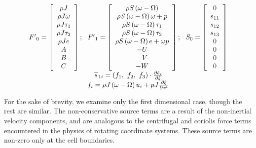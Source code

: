 \begin{equation}
\begin{array}{c}
{{F'}_0} = \left[ {\begin{array}{*{20}{c}}
{\rho J}\\
{\rho J\omega }\\
{\rho J{\tau _1}}\\
{\rho J{\tau _2}}\\
{\rho Je}\\
A\\
B\\
C
\end{array}} \right];\,\,\,\,{{F'}_1} = \left[ {\begin{array}{*{20}{c}}
{\rho S\left( {\omega  - \Omega } \right)}\\
{\rho S\left( {\omega  - \Omega } \right)\omega  + p}\\
{\rho S\left( {\omega  - \Omega } \right){\tau _1}}\\
{\rho S\left( {\omega  - \Omega } \right){\tau _2}}\\
{\rho S\left( {\omega  - \Omega } \right)e + \omega p}\\
{ - U}\\
{ - V}\\
{ - W}
\end{array}} \right];\,\,\,\,{S_0} = \left[ {\begin{array}{*{20}{c}}
0\\
{{s_{11}}}\\
{{s_{12}}}\\
{{s_{13}}}\\
0\\
0\\
0\\
0
\end{array}} \right]\\
{{\mathord{\buildrel{\lower3pt\hbox{$\scriptscriptstyle\rightharpoonup$}} 
\over s} }_{1i}} = \left( {{f_1},\,\,{f_2},\,\,{f_3}} \right) \cdot \frac{{\partial {{\hat e}_i}}}{{\partial \xi }}\\
{f_i} = \rho J\left( {\omega  - \Omega } \right){u_i} + pJ\frac{{\partial \xi }}{{\partial {x^i}}}
\end{array}
\end{equation}

For the sake of brevity, we examine only the first dimensional case, though the rest are similar. The non-conservative source terms are a result of the non-inertial velocity components, and are analogous to the centrifugal and coriolis force terms encountered in the physics of rotating coordinate systems. These source terms are non-zero only at the cell boundaries.


